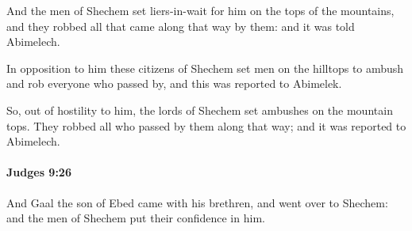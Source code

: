 			\begin{versebox}
					\item[BHS] 
					\item[ASV] And the men of Shechem set liers-in-wait for him on the tops of the mountains, and they robbed all that came along that way by them: and it was told Abimelech.
					\item[NIV] In opposition to him these citizens of Shechem set men on the hilltops to ambush and rob everyone who passed by, and this was reported to Abimelek.
					\item[NRSV] So, out of hostility to him, the lords of Shechem set ambushes on the mountain tops. They robbed all who passed by them along that way; and it was reported to Abimelech.
			\end{versebox}

		\paragraph{Judges 9:26} %
			\label{JUDGES-9-26}

			And Gaal the son of Ebed came with his brethren, and went over to Shechem: and the men of Shechem put their confidence in him.

